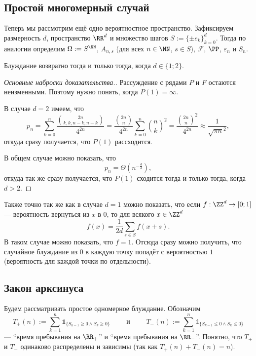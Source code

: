 \documentclass[12pt,a4paper]{article}
\newcommand{\ind}{\ensuremath{\mathds{1}}\xspace}
\begin{document}
    \subsection{Простой многомерный случай}

    Теперь мы рассмотрим ещё одно вероятностное пространство. Зафиксируем размерность $d$, пространство $\RR^d$ и множество шагов $S := \{\pm e_k\}_{k=0}^d$. Тогда по аналогии определим $\Omega := S^\NN$, $A_{n, s}$ (для всех $n \in \NN$, $s \in S$), $\mathcal{F}$, $\PP$, $\varepsilon_n$ и $S_n$.

    \begin{theorem}[Пойа]
        Блуждание возвратно тогда и только тогда, когда $d \in \{1; 2\}$.
    \end{theorem}

    \begin{proof}[Основные наброски доказательства.]
        Рассуждение с рядами $P$ и $F$ остаются неизменными. Поэтому нужно понять, когда $P(1) = \infty$.

        В случае $d = 2$ имеем, что
        \[
            p_n
            = \sum_{k=0}^n \frac{\binom{2n}{k, k, n-k, n-k}}{4^{2n}}
            = \frac{\binom{2n}{n}}{4^{2n}} \sum_{k=0}^n \binom{n}{k}^2
            = \frac{\binom{2n}{n}^2}{4^{2n}}
            \approx \frac{1}{\sqrt{\pi n}^2},
        \]
        откуда сразу получается, что $P(1)$ рассходится.

        В общем случае можно показать, что
        \[p_n = \Theta(n^{-\frac{d}{2}}),\]
        откуда так же сразу получается, что $P(1)$ сходится тогда и только тогда, когда $d > 2$.
    \end{proof}

    Также точно так же как в случае $d = 1$ можно показать, что если $f: \ZZ^d \to [0; 1]$ --- вероятность вернуться из $x$ в $0$, то для всякого $x \in \ZZ^d$ 
    \[f(x) = \frac{1}{2d} \sum_{s \in S} f(x + s).\]
    В таком случае можно показать, что $f = 1$. Отсюда сразу можно получить, что случайное блуждание из $0$ в каждую точку попадёт с вероятностью $1$ (вероятность для каждой точки по отдельности).

    \subsection{Закон арксинуса}

    Будем рассматривать простое одномерное блуждание. Обозначим
    \[
        T_+(n) := \sum_{k=1}^n \ind_{\{S_{k-1} \geqslant 0 \wedge S_k \geqslant 0\}}
        \qquad \text{ и } \qquad
        T_-(n) := \sum_{k=1}^n \ind_{\{S_{k-1} \leqslant 0 \wedge S_k \leqslant 0\}}
    \]
    --- ``время пребывания на $\RR_+$'' и ``время пребывания на $\RR_-$''. Понятно, что $T_+$ и $T_-$ одинаково распределены и зависимы (так как $T_+(n) + T_-(n) = n$).
\end{document}
